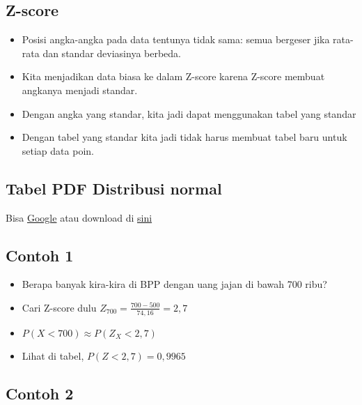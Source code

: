 \documentclass[
  letterpaper,
  DIV=11,
  numbers=noendperiod]{scrartcl}
\begin{document}
\hypertarget{z-score-3}{%
\subsection{Z-score}\label{z-score-3}}

\begin{itemize}
\item
  Posisi angka-angka pada data tentunya tidak sama: semua bergeser jika
  rata-rata dan standar deviasinya berbeda.
\item
  Kita menjadikan data biasa ke dalam Z-score karena Z-score membuat
  angkanya menjadi standar.
\item
  Dengan angka yang standar, kita jadi dapat menggunakan tabel yang
  standar
\item
  Dengan tabel yang standar kita jadi tidak harus membuat tabel baru
  untuk setiap data poin.
\end{itemize}

\hypertarget{tabel-pdf-distribusi-normal}{%
\subsection{Tabel PDF Distribusi
normal}\label{tabel-pdf-distribusi-normal}}

Bisa
\href{https://www.google.com/search?client=firefox-b-d\&q=z+score+table}{Google}
atau download di
\href{https://drive.google.com/file/d/1ywI58hnM8p0ZyFV7B9rCOosk72iCGguq/view?usp=sharing}{sini}

\hypertarget{contoh-1-1}{%
\subsection{Contoh 1}\label{contoh-1-1}}

\begin{itemize}
\item
  Berapa banyak kira-kira di BPP dengan uang jajan di bawah 700 ribu?
\item
  Cari Z-score dulu \(Z_{700}=\frac{700-500}{74,16}=2,7\)
\item
  \(P(X<700) \approx P(Z_X<2,7)\)
\item
  Lihat di tabel, \(P(Z<2,7)=0,9965\)
\end{itemize}

\hypertarget{contoh-2-1}{%
\subsection{Contoh 2}\label{contoh-2-1}}
\end{document}
